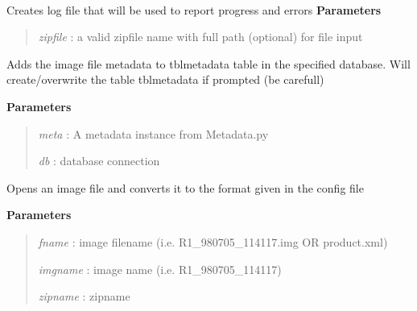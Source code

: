 \documentclass[letterpaper,10pt,openany,oneside]{sphinxmanual}
\begin{document}
\begin{fulllineitems}
\label{code:SigLib.SigLib}~

\begin{fulllineitems}
\label{code:SigLib.SigLib.createLog}
Creates log file that will be used to report progress and errors
\textbf{Parameters}
\begin{quote}

\emph{zipfile} : a valid zipfile name with full path (optional) for file input
\end{quote}

\end{fulllineitems}


\begin{fulllineitems}
\label{code:SigLib.SigLib.data2db}
Adds the image file metadata to tblmetadata table in the specified database.
Will create/overwrite the table tblmetadata if prompted (be carefull)

\textbf{Parameters}
\begin{quote}

\emph{meta} :   A metadata instance from Metadata.py

\emph{db}   :   database connection
\end{quote}

\end{fulllineitems}


\begin{fulllineitems}
\label{code:SigLib.SigLib.data2img}
Opens an image file and converts it to the format given in the config file

\textbf{Parameters}
\begin{quote}

\emph{fname}    : image filename (i.e. R1\_980705\_114117.img OR product.xml)

\emph{imgname}  : image name (i.e. R1\_980705\_114117)

\emph{zipname}  : zipname


\end{quote}
\end{fulllineitems}
\end{fulllineitems}
\end{document}
